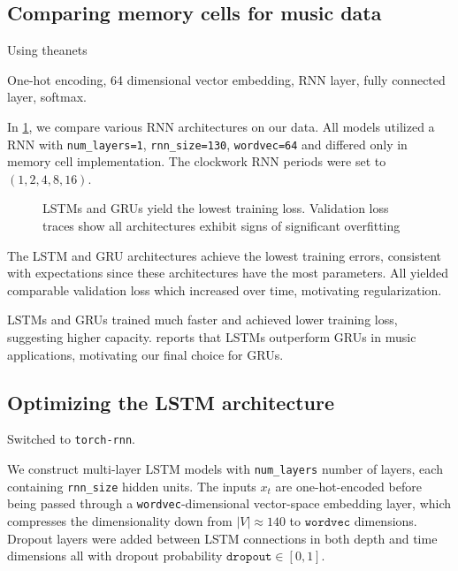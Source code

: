 \subsection{Comparing memory cells for music data}

Using theanets

One-hot encoding, 64 dimensional vector embedding, RNN layer, fully connected layer, softmax.

In \cref{fig:theanets-architecture}, we compare various RNN architectures on
our data. All models utilized a RNN with \texttt{num\_layers=1},
\texttt{rnn\_size=130}, \texttt{wordvec=64} and differed only in memory cell
implementation. The clockwork RNN periods were set to $(1, 2, 4, 8, 16)$.

\begin{figure}[tb]
    \centering
    
    \caption{LSTMs and GRUs yield the lowest training loss. Validation loss
      traces show all architectures exhibit signs of significant overfitting}
    \label{fig:theanets-architecture}
\end{figure}

The LSTM and GRU architectures achieve the lowest training errors, consistent
with expectations since these architectures have the most parameters. All
yielded comparable validation loss which increased over time, motivating
regularization.

LSTMs and GRUs trained much faster and achieved lower training loss, suggesting
higher capacity. \citep{Nayebi2015} reports that LSTMs outperform GRUs in music
applications, motivating our final choice for GRUs.

\subsection{Optimizing the LSTM architecture}
\label{sec:lstm-grid-search}

Switched to \texttt{torch-rnn}. 

We construct multi-layer LSTM models with \texttt{num\_layers} number of
layers, each containing \texttt{rnn\_size} hidden units. The inputs $x_t$ are
one-hot-encoded before being passed through a \texttt{wordvec}-dimensional
vector-space embedding layer, which compresses the dimensionality down from
$|V| \approx 140$ to $\texttt{wordvec}$ dimensions. Dropout layers were added
between LSTM connections in both depth and time dimensions all with dropout
probability $\texttt{dropout} \in [0,1]$.


